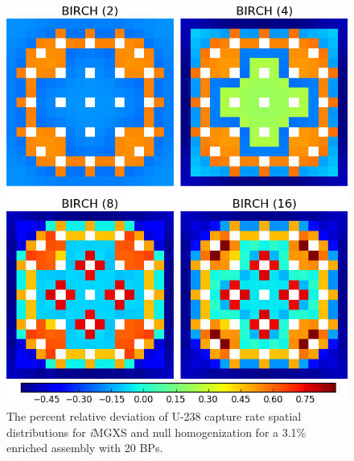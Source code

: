 \begin{figure}[h!]
\centering
\includegraphics[width=0.9\linewidth]{figures/results/compare/assm-31-20BPs/compare-capt}
\vspace{2mm}
\caption[U-238 capture rate \textit{i}MGXS-to-null relative deviations]{The percent relative deviation of U-238 capture rate spatial distributions for \textit{i}\ac{MGXS} and null homogenization for a 3.1\% enriched assembly with 20 \acp{BP}.}
\label{fig:chap11-assm-31-20BPs-capt-rates-comp}
\end{figure}
	
\clearpage

